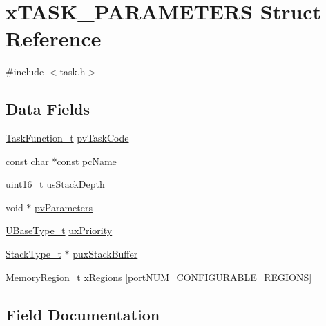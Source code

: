 \hypertarget{structx_t_a_s_k___p_a_r_a_m_e_t_e_r_s}{}\section{x\+T\+A\+S\+K\+\_\+\+P\+A\+R\+A\+M\+E\+T\+E\+RS Struct Reference}
\label{structx_t_a_s_k___p_a_r_a_m_e_t_e_r_s}


{\ttfamily \#include $<$task.\+h$>$}

\subsection*{Data Fields}
\begin{DoxyCompactItemize}
\item 
\mbox{\hyperlink{projdefs_8h_a9b32502ff92c255c686dacde53c1cba0}{Task\+Function\+\_\+t}} \mbox{\hyperlink{structx_t_a_s_k___p_a_r_a_m_e_t_e_r_s_a06aee8b42bc6c569b62ab3cdc4abf8b0}{pv\+Task\+Code}}
\item 
const char $\ast$const \mbox{\hyperlink{structx_t_a_s_k___p_a_r_a_m_e_t_e_r_s_a2de8afaf668518af9982627791b2cc23}{pc\+Name}}
\item 
uint16\+\_\+t \mbox{\hyperlink{structx_t_a_s_k___p_a_r_a_m_e_t_e_r_s_aae6fa1f3cc5f8b931225ed4b454f3865}{us\+Stack\+Depth}}
\item 
void $\ast$ \mbox{\hyperlink{structx_t_a_s_k___p_a_r_a_m_e_t_e_r_s_a308cef200968d514395c0272c061d3ec}{pv\+Parameters}}
\item 
\mbox{\hyperlink{portmacro_8h_a646f89d4298e4f5afd522202b11cb2e6}{U\+Base\+Type\+\_\+t}} \mbox{\hyperlink{structx_t_a_s_k___p_a_r_a_m_e_t_e_r_s_a0befed3dd0fe55b4314158f4814f50ae}{ux\+Priority}}
\item 
\mbox{\hyperlink{portmacro_8h_a84e9a8ba132feed0b2401c1f4e2ac63c}{Stack\+Type\+\_\+t}} $\ast$ \mbox{\hyperlink{structx_t_a_s_k___p_a_r_a_m_e_t_e_r_s_a3f80c2175bac00298ba9a17ddd50e29d}{pux\+Stack\+Buffer}}
\item 
\mbox{\hyperlink{task_8h_af609504de4d78ff6f71477ae47c66e51}{Memory\+Region\+\_\+t}} \mbox{\hyperlink{structx_t_a_s_k___p_a_r_a_m_e_t_e_r_s_a7bc9c069ce3a5e929c7ef29e95184584}{x\+Regions}} \mbox{[}\mbox{\hyperlink{portable_8h_aca7e1a8a568a38b74cc9db10c8efebda}{port\+N\+U\+M\+\_\+\+C\+O\+N\+F\+I\+G\+U\+R\+A\+B\+L\+E\+\_\+\+R\+E\+G\+I\+O\+NS}}\mbox{]}
\end{DoxyCompactItemize}


\subsection{Field Documentation}
\mbox{\label{structx_t_a_s_k___p_a_r_a_m_e_t_e_r_s_a2de8afaf668518af9982627791b2cc23}} 
